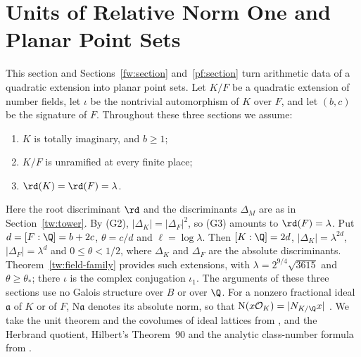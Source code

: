 \section{Units of Relative Norm One and Planar Point Sets}
\label{geo:section}

This section and Sections~\ref{fw:section} and~\ref{pf:section} turn
arithmetic data of a quadratic extension into planar point sets. Let $K/F$ be a quadratic extension of
number fields, let $\iota$ be the nontrivial automorphism of $K$ over
$F$, and let $(b,c)$ be the signature of $F$. Throughout these three
sections we assume:
\begin{enumerate}
\item[(G1)] $K$ is totally imaginary, and $b\ge1$;
\item[(G2)] $K/F$ is unramified at every finite place;
\item[(G3)] $\rd(K)=\rd(F)=\lambda$.
\end{enumerate}
Here the root discriminant $\rd$ and the discriminants $\Delta_M$ are as in
Section~\ref{tw:tower}. By (G2), $|\Delta_K|=|\Delta_F|^2$, so (G3) amounts
to $\rd(F)=\lambda$.
Put $d=[F:\Q]=b+2c$, $\theta=c/d$ and $\ell=\log\lambda$. Then
$[K:\Q]=2d$, $|\Delta_K|=\lambda^{2d}$, $|\Delta_F|=\lambda^d$ and
$0\le\theta<1/2$, where $\Delta_K$ and $\Delta_F$ are the absolute
discriminants. Theorem~\ref{tw:field-family} provides such extensions,
with $\lambda=2^{9/4}\sqrt{3615}$ and $\theta\ge\theta_*$; there $\iota$
is the complex conjugation $\iota_1$. The arguments of these three
sections use no Galois structure over $B$ or over $\Q$. For a nonzero
fractional ideal $\mathfrak a$ of $K$ or of $F$, $\mathrm N\mathfrak a$ denotes
its absolute norm, so that $\mathrm N(x\mathcal O_K)=|N_{K/\Q}x|$
\cite[Propositions~4.1 and~4.2]{MilneANT}. We take the unit theorem and
the covolumes of ideal lattices from \cite{MilneANT}, and the Herbrand
quotient, Hilbert's Theorem~90 and the analytic class-number formula
from \cite{MilneCFT}.

